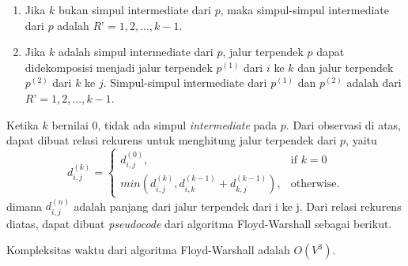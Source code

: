   \begin{enumerate}
    \item Jika $k$ bukan simpul intermediate dari $p$, maka simpul-simpul intermediate dari $p$ adalah $R’ = {1, 2, ..., k-1}$.
    \item Jika $k$ adalah simpul intermediate dari $p$, jalur terpendek $p$ dapat didekomposisi menjadi jalur terpendek $p^{(1)}$ dari $i$ ke $k$ 
    dan jalur terpendek $p^{(2)}$ dari $k$ ke $j$. Simpul-simpul intermediate dari $p^{(1)}$ dan $p^{(2)}$ adalah dari $R’ = {1, 2, ..., k-1}$.
  \end{enumerate}

  Ketika $k$ bernilai 0, tidak ada simpul \textit{intermediate} pada $p$. Dari observasi di atas,
  dapat dibuat relasi rekurens untuk menghitung jalur terpendek dari $p$, yaitu
  \begin{equation}
    d_{i,j}^{(k)} =
    \begin{cases}
      d_{i,j}^{(0)}, & \text{if } k = 0\\
      min(d_{i,j}^{(k)}, d_{i,k}^{(k-1)} + d_{k,j}^{(k-1)}), & \text{otherwise}.
    \end{cases}
  \end{equation}
  dimana $d_{i,j}^{(n)}$ adalah panjang dari jalur terpendek dari i ke j. Dari relasi rekurens
  diatas, dapat dibuat \textit{pseudocode} dari algoritma Floyd-Warshall sebagai berikut.

  \medskip
  

  Kompleksitas waktu dari algoritma Floyd-Warshall adalah $O(V^{3})$.
